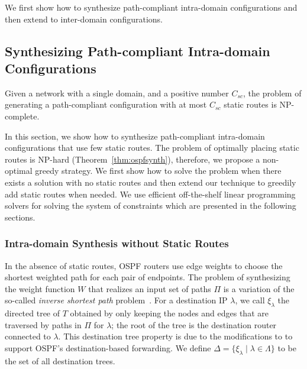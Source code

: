 We first show how to synthesize 
path-compliant intra-domain 
configurations and then extend to
 inter-domain configurations.



\subsection{Synthesizing Path-compliant Intra-domain \\ Configurations} \label{sec:intra-synthesis}

\iffull
\begin{theorem}
\label{thm:ospfsynth}
Given a
network with a single domain,
and a positive number $C_{sc}$,
the problem of generating
a path-compliant configuration with at most $C_{sc}$ static routes
is NP-complete.
\end{theorem}

\fi

In this section, we show how to synthesize 
path-compliant  intra-domain configurations that
use few static routes.
The problem of optimally placing 
static routes is NP-hard (Theorem~\ref{thm:ospfsynth}), 
therefore, we propose a non-optimal greedy strategy.
We first show how to solve the problem when 
there exists a solution with no static routes
and then extend our technique to greedily 
add static routes when needed. We use 
efficient off-the-shelf linear programming 
solvers for solving the system of constraints 
which are presented in the following sections. 
	

\subsubsection{Intra-domain Synthesis without Static Routes} \label{sec:ospf}\hspace*{4mm}


 
In the absence of static routes,
OSPF routers use edge weights to choose the
shortest weighted path for each pair of endpoints. 
The problem of synthesizing the weight function $W$ that
realizes an input set of paths $\Pi$ is a
variation of the so-called {\em inverse shortest path} 
problem~\cite{isp}. 
For a destination IP $\lambda$, we call $\xi_\lambda$ 
the directed tree of $T$ 
obtained by only keeping the nodes and edges 
that are traversed by paths in $\Pi$ for 
$\lambda$; the root of the tree
is the destination router connected to $\lambda$. 
 This destination tree
 property is due to the modifications to \genesis
 to support OSPF's destination-based forwarding. We
 define $\Delta=\{\xi_\lambda\mid \lambda \in \Lambda\}$ to be 
the set of all destination trees. 

